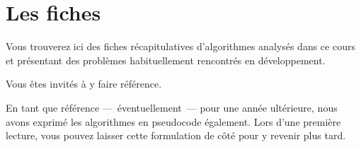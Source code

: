 \chapter{Les fiches}

Vous trouverez ici des fiches récapitulatives d'algorithmes analysés dans ce
cours et présentant des problèmes habituellement rencontrés en développement. 

Vous êtes invités à y faire référence.

En tant que référence —~éventuellement~— pour une année ultérieure, nous avons
exprimé les algorithmes en pseudocode également. Lors d'une première lecture,
vous pouvez laisser cette formulation de côté pour y revenir plus tard.

\vspace*{-3cm}
\listoffiche

\clearpage
\clearpage
\clearpage		
\clearpage		
\clearpage		
\clearpage		
\clearpage		
\clearpage
\clearpage
\clearpage		
\clearpage		
